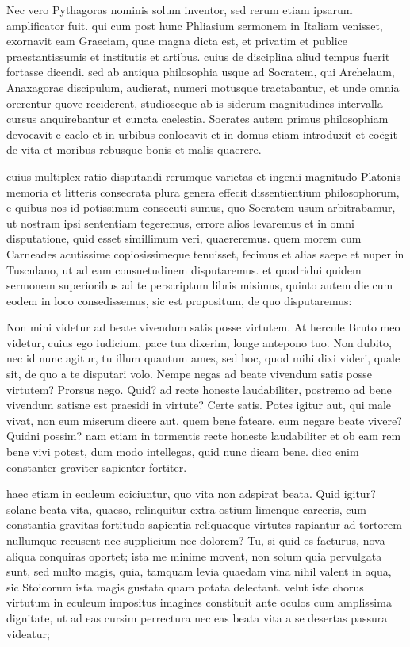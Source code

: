  Nec vero Pythagoras nominis solum inventor, sed rerum etiam ipsarum amplificator fuit. qui cum post hunc Phliasium sermonem in Italiam venisset, exornavit eam Graeciam, quae magna dicta est, et privatim et publice praestantissumis et institutis et artibus. cuius de disciplina aliud tempus fuerit fortasse dicendi. sed ab antiqua philosophia usque ad Socratem, qui Archelaum, Anaxagorae discipulum, audierat, numeri motusque tractabantur, et unde omnia orerentur quove reciderent, studioseque ab is siderum magnitudines intervalla cursus anquirebantur et cuncta caelestia. Socrates autem primus philosophiam devocavit e caelo et in urbibus conlocavit et in domus etiam introduxit et coëgit de vita et moribus rebusque bonis et malis quaerere.

 cuius multiplex ratio disputandi rerumque varietas et ingenii magnitudo Platonis memoria et litteris consecrata plura genera effecit dissentientium philosophorum, e quibus nos id potissimum consecuti sumus, quo Socratem usum arbitrabamur, ut nostram ipsi sententiam tegeremus, errore alios levaremus et in omni disputatione, quid esset simillimum veri, quaereremus. quem morem cum Carneades acutissime copiosissimeque tenuisset, fecimus et alias saepe et nuper in Tusculano, ut ad eam consuetudinem disputaremus. et quadridui quidem sermonem superioribus ad te perscriptum libris misimus, quinto autem die cum eodem in loco consedissemus, sic est propositum, de quo disputaremus:

 Non mihi videtur ad beate vivendum satis posse virtutem. At hercule Bruto meo videtur, cuius ego iudicium, pace tua dixerim, longe antepono tuo. Non dubito, nec id nunc agitur, tu illum quantum ames, sed hoc, quod mihi dixi videri, quale sit, de quo a te disputari volo. Nempe negas ad beate vivendum satis posse virtutem? Prorsus nego. Quid? ad recte honeste laudabiliter, postremo ad bene vivendum satisne est praesidi in virtute? Certe satis. Potes igitur aut, qui male vivat, non eum miserum dicere aut, quem bene fateare, eum negare beate vivere? Quidni possim? nam etiam in tormentis recte honeste laudabiliter et ob eam rem bene vivi potest, dum modo intellegas, quid nunc dicam bene. dico enim constanter graviter sapienter fortiter.

 haec etiam in eculeum coiciuntur, quo vita non adspirat beata. Quid igitur? solane beata vita, quaeso, relinquitur extra ostium limenque carceris, cum constantia gravitas fortitudo sapientia reliquaeque virtutes rapiantur ad tortorem nullumque recusent nec supplicium nec dolorem? Tu, si quid es facturus, nova aliqua conquiras oportet; ista me minime movent, non solum quia pervulgata sunt, sed multo magis, quia, tamquam levia quaedam vina nihil valent in aqua, sic Stoicorum ista magis gustata quam potata delectant. velut iste chorus virtutum in eculeum impositus imagines constituit ante oculos cum amplissima dignitate, ut ad eas cursim perrectura nec eas beata vita a se desertas passura videatur;

